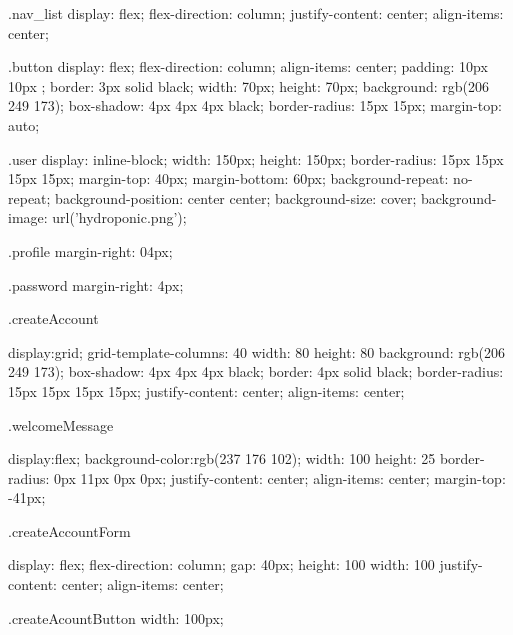 \documentclass[12pt]{article} %
\begin{document}
    \begin{htmlcode}[caption={CSS Stlye Sheet}]
    
    .nav_list
    {
        display: flex;
        flex-direction: column;
        justify-content: center;
        align-items: center;
    }
        
        
        
    .button
    {
       display: flex;
       flex-direction: column;
       align-items: center;
       padding: 10px 10px ;
       border: 3px solid black;
       width: 70px; 
       height: 70px; 
       background: rgb(206 249 173);
       box-shadow: 4px 4px 4px black;
       border-radius: 15px 15px;
       margin-top: auto;
    }
        
    .user 
    {
       display: inline-block;
       width: 150px;
       height: 150px;
       border-radius: 15px 15px 15px 15px;
       margin-top: 40px;
       margin-bottom: 60px;
       background-repeat: no-repeat;
       background-position: center center;
       background-size: cover;
       background-image: url('hydroponic.png');
    }
        
    .profile
    {
       margin-right: 04px;
    }
        
    .password
    {
       margin-right: 4px;
    }
    
    
    .createAccount
    {
       display:grid;
       grid-template-columns: 40%
       width: 80%
       height: 80%
       background: rgb(206 249 173);
       box-shadow: 4px 4px 4px black;
       border: 4px solid black;
       border-radius: 15px 15px 15px 15px;
       justify-content: center;
       align-items: center;
    
    }
    
    .welcomeMessage
    {
       display:flex;
       background-color:rgb(237 176 102); 
       width: 100%
       height: 25%
       border-radius: 0px 11px 0px 0px;
       justify-content: center;
       align-items: center;
       margin-top: -41px;
       
    }
    
    .createAccountForm
    {
       display: flex;
       flex-direction: column;
       gap: 40px;
       height: 100%
       width: 100%
       justify-content: center;
       align-items: center;
    
    }
    
    .createAcountButton 
    {
    width: 100px;
    }
    
    
    

\end{htmlcode}
\end{document}
